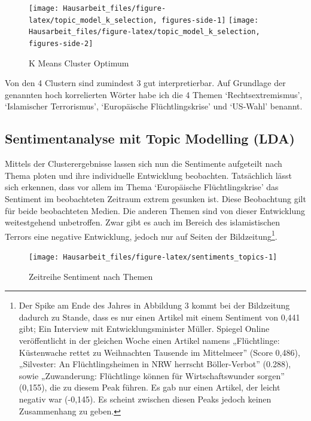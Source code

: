 \documentclass[
  11pt,
]{article}
\begin{document}
\begin{figure}[H]
\texttt{[image: Hausarbeit\_files/figure-latex/topic\_model\_k\_selection, figures-side-1]} \texttt{[image: Hausarbeit\_files/figure-latex/topic\_model\_k\_selection, figures-side-2]} \caption{K Means Cluster Optimum}\label{fig:topic_model_k_selection, figures-side}
\end{figure}

Von den 4 Clustern sind zumindest 3 gut interpretierbar. Auf Grundlage
der genannten hoch korrelierten Wörter habe ich die 4 Themen
`Rechtsextremismus', `Islamischer Terrorismus', `Europäische
Flüchtlingskrise' und `US-Wahl' benannt.

\hypertarget{sentimentanalyse-mit-topic-modelling-lda}{%
\subsection{Sentimentanalyse mit Topic Modelling
(LDA)}\label{sentimentanalyse-mit-topic-modelling-lda}}

Mittels der Clusterergebnisse lassen sich nun die Sentimente aufgeteilt
nach Thema ploten und ihre individuelle Entwicklung beobachten.
Tatsächlich lässt sich erkennen, dass vor allem im Thema `Europäische
Flüchtlingskrise' das Sentiment im beobachteten Zeitraum extrem gesunken
ist. Diese Beobachtung gilt für beide beobachteten Medien. Die anderen
Themen sind von dieser Entwicklung weitestgehend unbetroffen. Zwar gibt
es auch im Bereich des islamistischen Terrors eine negative Entwicklung,
jedoch nur auf Seiten der Bildzeitung\footnote{Der Spike am Ende des
  Jahres in Abbildung 3 kommt bei der Bildzeitung dadurch zu Stande,
  dass es nur einen Artikel mit einem Sentiment von 0,441 gibt; Ein
  Interview mit Entwicklungsminister Müller. Spiegel Online
  veröffentlicht in der gleichen Woche einen Artikel namens
  „Flüchtlinge: Küstenwache rettet zu Weihnachten Tausende im
  Mittelmeer'' (Score 0,486), „Silvester: An Flüchtlingsheimen in NRW
  herrscht Böller-Verbot'' (0.288), sowie „Zuwanderung: Flüchtlinge
  können für Wirtschaftswunder sorgen'' (0,155), die zu diesem Peak
  führen. Es gab nur einen Artikel, der leicht negativ war (-0,145). Es
  scheint zwischen diesen Peaks jedoch keinen Zusammenhang zu geben.}.

\begin{figure}[H]
\texttt{[image: Hausarbeit\_files/figure-latex/sentiments\_topics-1]} \caption{Zeitreihe Sentiment nach Themen}\label{fig:sentiments_topics}
\end{figure}
\end{document}
